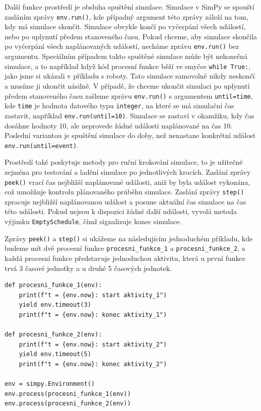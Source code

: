 \documentclass[12pt,a4paper]{article}
\begin{document}
Další funkce prostředí je obsluha spuštění simulace. Simulace v SimPy se spouští zasláním zprávy \texttt{env.run()}, kde případný argument této zprávy záleží na tom, kdy má simulace skončit. Simulace obvykle končí po vyčerpání všech událostí, nebo po uplynutí předem stanoveného času. Pokud chceme, aby simulace skončila po vyčerpání všech naplánovaných událostí, necháme zprávu \texttt{env.run()} bez argumentu. Speciálním případem takto spuštěné simulace může být nekonečná simulace, a to například když kód procesní funkce běží ve smyčce \texttt{while True:}, jako jsme si ukázali v příkladu s roboty. Tato simulace samovolně nikdy neskončí a musíme ji ukončit násilně.
V případě, že chceme ukončit simulaci po uplynutí předem stanoveného času zašleme zprávu \texttt{env.run()} s argumentem \texttt{until=time}, kde \texttt{time} je hodnota datového typu \texttt{integer}, na které se má simulační čas zastavit, například \texttt{env.run(until=10)}. Simulace se zastaví v okamžiku, kdy čas dosáhne hodnoty 10, ale neprovede žádné události naplánované na čas 10. Poslední variantou je spuštění simulace do doby, než nenastane konkrétní událost \texttt{env.run(until=event)}. 

Prostředí také poskytuje metody pro ruční krokování simulace, to je užitečné zejména pro testování a ladění simulace po jednotlivých krocích. Zaslání zprávy \texttt{peek()} vrací čas nejbližší naplánované události, aniž by byla událost vykonána, což umožňuje kontrolu plánovaného průběhu simulace. Zaslání zprávy \texttt{step()} zpracuje nejbližší naplánovanou událost a posune aktuální čas simulace na čas této události. Pokud nejsou k dispozici žádné další události, vyvolá metoda výjimku \texttt{EmptySchedule}, čímž signalizuje konec simulace. 

Zprávy \texttt{peek()} a \texttt{step()} si ukážeme na následujícím jednoduchém příkladu, kde budeme mít dvě procesní funkce \texttt{procesni\_funkce\_1} a \texttt{procesni\_funkce\_2}, a každá procesní funkce představuje jednoduchou aktivitu, která u první funkce trvá 3 časové jednotky a u druhé 5 časových jednotek.

 \begin{verbatim} 
def procesni_funkce_1(env):
    print(f"t = {env.now}: start aktivity_1")
    yield env.timeout(3)
    print(f"t = {env.now}: konec aktivity_1")

def procesni_funkce_2(env):
    print(f"t = {env.now}: start aktivity_2")
    yield env.timeout(5)
    print(f"t = {env.now}: konec aktivity_2")

env = simpy.Environment()
env.process(procesni_funkce_1(env))
env.process(procesni_funkce_2(env))

\end{verbatim}
\end{document}
